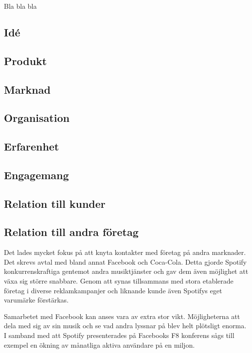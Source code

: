 Bla bla bla

\subsection{Idé}

\subsection{Produkt}

\subsection{Marknad}


\subsection{Organisation}

\subsection{Erfarenhet}

\subsection{Engagemang}

\subsection{Relation till kunder}

\subsection{Relation till andra företag}
Det lades mycket fokus på att knyta kontakter med företag på andra marknader. Det skrevs avtal med bland annat Facebook och Coca-Cola. Detta gjorde Spotify konkurrenskraftiga gentemot andra musiktjänster och gav dem även möjlighet att växa sig större snabbare. Genom att synas tillsammans med stora etablerade företag i diverse reklamkampanjer och liknande kunde även Spotifys eget varumärke förstärkas. 

Samarbetet med Facebook kan anses vara av extra stor vikt. Möjligheterna att dela med sig av sin musik och se vad andra lyssnar på blev helt plötsligt enorma. I samband med att Spotify presenterades på Facebooks F8 konferens sågs till exempel en ökning av månatliga aktiva användare på en miljon. 

